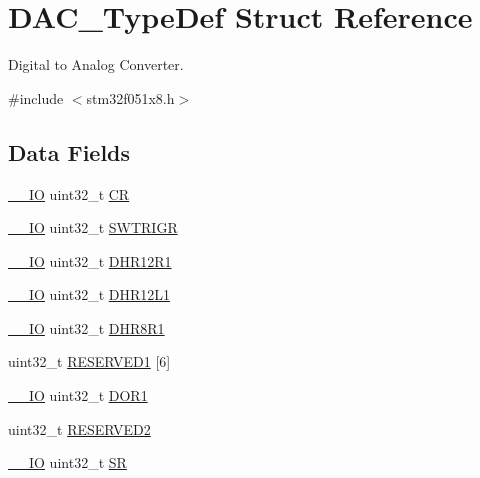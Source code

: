 \hypertarget{struct_d_a_c___type_def}{}\section{D\+A\+C\+\_\+\+Type\+Def Struct Reference}
\label{struct_d_a_c___type_def}


Digital to Analog Converter.  




{\ttfamily \#include $<$stm32f051x8.\+h$>$}

\subsection*{Data Fields}
\begin{DoxyCompactItemize}
\item 
\hyperlink{core__sc300_8h_aec43007d9998a0a0e01faede4133d6be}{\+\_\+\+\_\+\+IO} uint32\+\_\+t \hyperlink{struct_d_a_c___type_def_ab40c89c59391aaa9d9a8ec011dd0907a}{CR}
\item 
\hyperlink{core__sc300_8h_aec43007d9998a0a0e01faede4133d6be}{\+\_\+\+\_\+\+IO} uint32\+\_\+t \hyperlink{struct_d_a_c___type_def_a896bbb7153af0b67ad772360feaceeb4}{S\+W\+T\+R\+I\+GR}
\item 
\hyperlink{core__sc300_8h_aec43007d9998a0a0e01faede4133d6be}{\+\_\+\+\_\+\+IO} uint32\+\_\+t \hyperlink{struct_d_a_c___type_def_ac2bb55b037b800a25852736afdd7a258}{D\+H\+R12\+R1}
\item 
\hyperlink{core__sc300_8h_aec43007d9998a0a0e01faede4133d6be}{\+\_\+\+\_\+\+IO} uint32\+\_\+t \hyperlink{struct_d_a_c___type_def_ae9028b8bcb5118b7073165fb50fcd559}{D\+H\+R12\+L1}
\item 
\hyperlink{core__sc300_8h_aec43007d9998a0a0e01faede4133d6be}{\+\_\+\+\_\+\+IO} uint32\+\_\+t \hyperlink{struct_d_a_c___type_def_ad0a200e12acad17a5c7d2059159ea7e1}{D\+H\+R8\+R1}
\item 
uint32\+\_\+t \hyperlink{struct_d_a_c___type_def_a21d81c039555cdf959e3427338a77ac5}{R\+E\+S\+E\+R\+V\+E\+D1} \mbox{[}6\mbox{]}
\item 
\hyperlink{core__sc300_8h_aec43007d9998a0a0e01faede4133d6be}{\+\_\+\+\_\+\+IO} uint32\+\_\+t \hyperlink{struct_d_a_c___type_def_aa710505be03a41981c35bacc7ce20746}{D\+O\+R1}
\item 
uint32\+\_\+t \hyperlink{struct_d_a_c___type_def_a4c9b972a304c0e08ca27cbe57627c496}{R\+E\+S\+E\+R\+V\+E\+D2}
\item 
\hyperlink{core__sc300_8h_aec43007d9998a0a0e01faede4133d6be}{\+\_\+\+\_\+\+IO} uint32\+\_\+t \hyperlink{struct_d_a_c___type_def_af6aca2bbd40c0fb6df7c3aebe224a360}{SR}

\end{DoxyCompactItemize}
